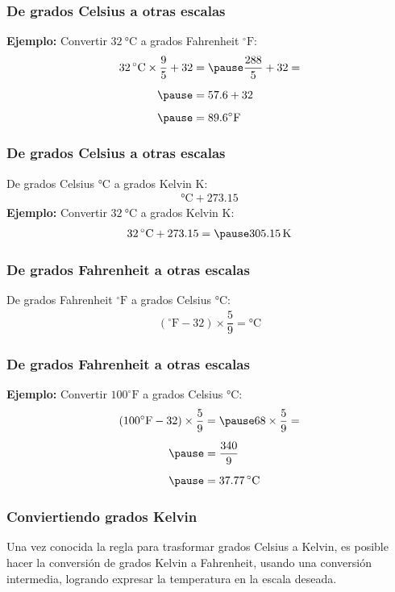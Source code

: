 \documentclass[12pt]{beamer}
\begin{document}
\begin{frame}
\frametitle{De grados Celsius a otras escalas}
\textbf{Ejemplo:} Convertir $\SI{32}{\degreeCelsius}$ a grados Fahrenheit $^{\circ} \text{F}$:
\pause
\begin{eqnarray*}
\begin{aligned}
\SI{32}{\degreeCelsius} \times \dfrac{9}{5} + 32 &= \pause \dfrac{288}{5} + 32 = \\[0.5em] \pause
&= 57.6 + 32 \\[0.5em] \pause
&= 89.6^{\circ} \text{F} 
\end{aligned}
\end{eqnarray*}
\end{frame}
\begin{frame}
\frametitle{De grados Celsius a otras escalas}
De grados Celsius $\unit{\degreeCelsius}$ a grados Kelvin $\unit{\kelvin}$:
\pause
\begin{align*}
\unit{\degreeCelsius} + 273.15
\end{align*}
\pause
\textbf{Ejemplo:} Convertir $\SI{32}{\degreeCelsius}$ a grados Kelvin $\unit{\kelvin}$:
\pause
\begin{eqnarray*}
\begin{aligned}
\SI{32}{\degreeCelsius} + 273.15 = \pause \SI{305.15}{\kelvin}
\end{aligned}
\end{eqnarray*}
\end{frame}
\begin{frame}
\frametitle{De grados Fahrenheit a otras escalas}
De grados Fahrenheit $^{\circ} \text{F}$ a grados Celsius $\unit{\degreeCelsius}$:
\pause
\begin{align*}
\left( ^{\circ} \text{F} - 32 \right) \times \dfrac{5}{9} = \unit{\degreeCelsius}
\end{align*}
\end{frame}
\begin{frame}
\frametitle{De grados Fahrenheit a otras escalas}
\textbf{Ejemplo:} Convertir $100^{\circ} \text{F}$ a grados Celsius $\unit{\degreeCelsius}$:
\pause
\begin{eqnarray*}
\begin{aligned}
\left( 100^{\circ} \text{F} - 32 \right) \times \dfrac{5}{9} &= \pause 68 \times \dfrac{5}{9} = \\[0.5em] \pause
&= \dfrac{340}{9} \\[0.5em] \pause
&= \SI{37.77}{\degreeCelsius}
\end{aligned}
\end{eqnarray*}
\end{frame}
\begin{frame}
\frametitle{Conviertiendo grados Kelvin}
Una vez conocida la regla para trasformar grados Celsius a Kelvin, es posible hacer la conversión de grados Kelvin a Fahrenheit, usando una conversión intermedia, logrando expresar la temperatura en la escala deseada.
\end{frame}
\end{document}
